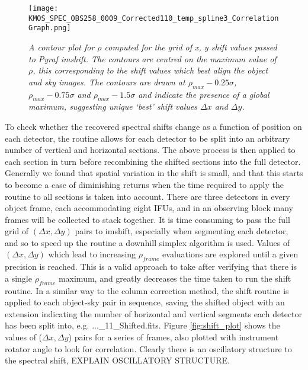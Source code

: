 \documentclass{literature}
\begin{document}
       
\begin{figure}[!htp]
\centering
\texttt{[image: KMOS\_SPEC\_OBS258\_0009\_Corrected110\_temp\_spline3\_CorrelationGraph.png]}
\caption{\footnotesize{\emph{A contour plot for $\rho$ computed for the grid of x, y shift values passed to Pyraf imshift. The contours are centred on the maximum value of $\rho$, this corresponding to the shift values which best align the object and sky images. The contours are drawn at $\rho _{max} - 0.25\sigma$, $\rho _{max} - 0.75\sigma$ and $\rho _{max} - 1.5\sigma$ and indicate the presence of a global maximum, suggesting unique `best' shift values $\Delta x$ and $\Delta y$.}}}
\label{fig:rho_plot}
\end{figure}

To check whether the recovered spectral shifts change as a function of position on each detector, the routine allows for each detector to be split into an arbitrary number of vertical and horizontal sections. The above process is then applied to each section in turn before recombining the shifted sections into the full detector. Generally we found that spatial variation in the shift is small, and that this starts to become a case of diminishing returns when the time required to apply the routine to all sections is taken into account. There are three detectors in every object frame, each accommodating eight IFUs, and in an observing block many frames will be collected to stack together. It is time consuming to pass the full grid of $(\Delta x, \Delta y)$ pairs to imshift, especially when segmenting each detector, and so to speed up the routine a downhill simplex algorithm is used. Values of $(\Delta x, \Delta y)$ which lead to increasing $\rho_{frame}$ evaluations are explored until a given precision is reached. This is a valid approach to take after verifying that there is a single $\rho_{frame}$ maximum, and greatly decreases the time taken to run the shift routine. In a similar way to the column correction method, the shift routine is applied to each object-sky pair in sequence, saving the shifted object with an extension indicating the number of horizontal and vertical segments each detector has been split into, e.g. ...\_11\_Shifted.fits. Figure \ref{fig:shift_plot} shows the values of ($\Delta x, \Delta y$) pairs for a series of frames, also plotted with instrument rotator angle to look for correlation. Clearly there is an oscillatory structure to the spectral shift, EXPLAIN OSCILLATORY STRUCTURE. \\ 
\end{document}
